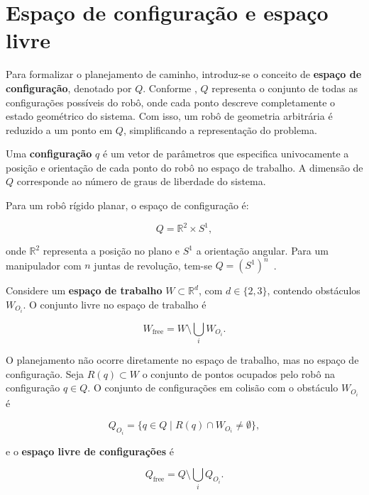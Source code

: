 \section{Espaço de configuração e espaço livre}
\label{sec:espaco_configuracao}

Para formalizar o planejamento de caminho, introduz-se o conceito de \textbf{espaço de configuração}, denotado por $Q$. Conforme \citet{choset2005principles}, $Q$ representa o conjunto de todas as configurações possíveis do robô, onde cada ponto descreve completamente o estado geométrico do sistema. Com isso, um robô de geometria arbitrária é reduzido a um ponto em $Q$, simplificando a representação do problema.

Uma \textbf{configuração} $q$ é um vetor de parâmetros que especifica univocamente a posição e orientação de cada ponto do robô no espaço de trabalho. A dimensão de $Q$ corresponde ao número de graus de liberdade do sistema.

Para um robô rígido planar, o espaço de configuração é:

\begin{equation}
    Q = \mathbb{R}^2 \times S^1,
    \label{eq:cspace_planar}
\end{equation}

onde $\mathbb{R}^2$ representa a posição no plano e $S^1$ a orientação angular. Para um manipulador com $n$ juntas de revolução, tem-se $Q = (S^1)^n$~\cite{choset2005principles}.

Considere um \textbf{espaço de trabalho} $W \subset \mathbb{R}^d$, com $d \in \{2, 3\}$, contendo obstáculos $W_{O_i}$. O conjunto livre no espaço de trabalho é

\begin{equation}
    W_{\mathrm{free}} = W \setminus \bigcup_i W_{O_i}.
    \label{eq:wfree}
\end{equation}

O planejamento não ocorre diretamente no espaço de trabalho, mas no espaço de configuração. Seja $R(q) \subset W$ o conjunto de pontos ocupados pelo robô na configuração $q \in Q$. O conjunto de configurações em colisão com o obstáculo $W_{O_i}$ é

\begin{equation}
    Q_{O_i} = \bigl\{ q \in Q \mid R(q) \cap W_{O_i} \neq \emptyset \bigr\},
    \label{eq:qobs}
\end{equation}

e o \textbf{espaço livre de configurações} é

\begin{equation}
    Q_{\mathrm{free}} = Q \setminus \bigcup_i Q_{O_i}.
    \label{eq:qfree}
\end{equation}

